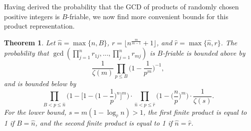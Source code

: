 \documentclass[10pt,a4paper]{article}
\newtheorem{theorem}{Theorem}[section]
\theoremstyle{definition}
\theoremstyle{remark}
\begin{document}
Having derived the probability that the GCD of products of randomly chosen positive integers is $B$-friable, we now find more convenient bounds for this product representation.

\begin{theorem} Let $\hat{n}=\max\{n,B\}$, $r=\lfloor n^{\frac{m}{m-1}}+1\rfloor$, and $\hat{r}=\max\{\hat{n},r\}$. The probability that $\gcd(\prod_{j=1}^n r_{1j}, ..., \prod_{j=1}^{n}r_{mj})$ is $B$-friable is bounded above by 
$$\frac{1}{\zeta(m)}\prod_{p\leq B}\Big(1-\frac{1}{p^m}\Big)^{-1},$$
and is bounded below by 
$$\prod_{B<p\leq\hat{n}} \Big(1 - \Big[1 - \Big(1 - \frac{1}{p}\Big)^n \Big]^m\Big) \cdot \prod_{\hat{n}<p\leq\hat{r}} \Big(1 - \Big(\frac{n}{p}\Big)^m\Big) \cdot \frac{1}{\zeta(s)}.$$
For the lower bound, $s = m(1 - \log_{\hat{r}}{n}) > 1$, the first finite product is equal to 1 if $B = \hat{n}$, and the second finite product is equal to 1 if $\hat{n}=\hat{r}$.
\end{theorem} 
 
\end{document}
